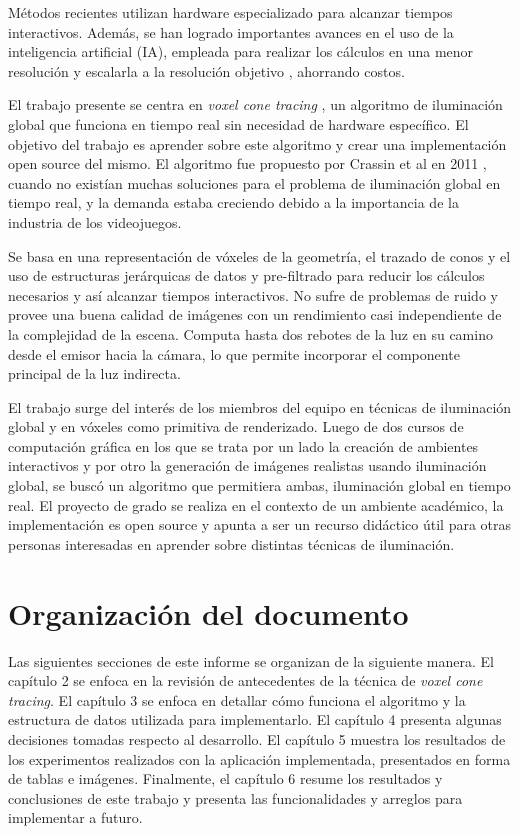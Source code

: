 Métodos recientes utilizan hardware especializado para alcanzar tiempos interactivos.
Además, se han logrado importantes avances en el uso de la inteligencia artificial (IA), empleada para realizar los cálculos en una menor resolución y escalarla a la resolución objetivo \cite{image-super-resolution-survey}, ahorrando costos.

El trabajo presente se centra en \textit{voxel cone tracing} \cite{voxel-cone-tracing}, un algoritmo de iluminación global que funciona en tiempo real sin necesidad de hardware específico.
El objetivo del trabajo es aprender sobre este algoritmo y crear una implementación open source del mismo.
El algoritmo fue propuesto por Crassin et al en 2011 \cite{voxel-cone-tracing}, cuando no existían muchas soluciones para el problema de iluminación global en tiempo real, y la demanda estaba creciendo debido a la importancia de la industria de los videojuegos.

Se basa en una representación de vóxeles \cite[p.~578]{rtr} de la geometría, el trazado de conos \cite{ray-tracing-with-cones} y el uso de estructuras jerárquicas de datos y pre-filtrado para reducir los cálculos necesarios y así alcanzar tiempos interactivos.
No sufre de problemas de ruido y provee una buena calidad de imágenes con un rendimiento casi independiente de la complejidad de la escena.
Computa hasta dos rebotes de la luz en su camino desde el emisor hacia la cámara, lo que permite incorporar el componente principal de la luz indirecta.

El trabajo surge del interés de los miembros del equipo en técnicas de iluminación global y en vóxeles como primitiva de renderizado.
Luego de dos cursos de computación gráfica en los que se trata por un lado la creación de ambientes interactivos y por otro la generación de imágenes realistas usando iluminación global, se buscó un algoritmo que permitiera ambas, iluminación global en tiempo real.
El proyecto de grado se realiza en el contexto de un ambiente académico, la implementación es open source y apunta a ser un recurso didáctico útil para otras personas interesadas en aprender sobre distintas técnicas de iluminación.

\section{Organización del documento}

Las siguientes secciones de este informe se organizan de la siguiente manera.
El capítulo 2 se enfoca en la revisión de antecedentes de la técnica de \textit{voxel cone tracing}.
El capítulo 3 se enfoca en detallar cómo funciona el algoritmo y la estructura de datos utilizada para implementarlo.
El capítulo 4 presenta algunas decisiones tomadas respecto al desarrollo.
El capítulo 5 muestra los resultados de los experimentos realizados con la aplicación implementada, presentados en forma de tablas e imágenes.
Finalmente, el capítulo 6 resume los resultados y conclusiones de este trabajo y presenta las funcionalidades y arreglos para implementar a futuro.
